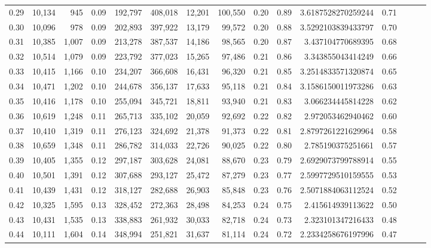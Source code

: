 \begin{tabular}{rrrrrrrrrrrrrrr}
0.29 &  10,134 &    945 &  0.09 &  192,797 &  408,018 &   12,201 &  100,550 &  0.20 &  0.89 &    3.6187528270259244 &      0.71 \\
0.30 &  10,096 &    978 &  0.09 &  202,893 &  397,922 &   13,179 &   99,572 &  0.20 &  0.88 &    3.5292103839433797 &      0.70 \\
0.31 &  10,385 &  1,007 &  0.09 &  213,278 &  387,537 &   14,186 &   98,565 &  0.20 &  0.87 &     3.437104770689395 &      0.68 \\
0.32 &  10,514 &  1,079 &  0.09 &  223,792 &  377,023 &   15,265 &   97,486 &  0.21 &  0.86 &     3.343855043414249 &      0.66 \\
0.33 &  10,415 &  1,166 &  0.10 &  234,207 &  366,608 &   16,431 &   96,320 &  0.21 &  0.85 &    3.2514833571320874 &      0.65 \\
0.34 &  10,471 &  1,202 &  0.10 &  244,678 &  356,137 &   17,633 &   95,118 &  0.21 &  0.84 &    3.1586150011973286 &      0.63 \\
0.35 &  10,416 &  1,178 &  0.10 &  255,094 &  345,721 &   18,811 &   93,940 &  0.21 &  0.83 &     3.066234445814228 &      0.62 \\
0.36 &  10,619 &  1,248 &  0.11 &  265,713 &  335,102 &   20,059 &   92,692 &  0.22 &  0.82 &     2.972053462940462 &      0.60 \\
0.37 &  10,410 &  1,319 &  0.11 &  276,123 &  324,692 &   21,378 &   91,373 &  0.22 &  0.81 &    2.8797261221629964 &      0.58 \\
0.38 &  10,659 &  1,348 &  0.11 &  286,782 &  314,033 &   22,726 &   90,025 &  0.22 &  0.80 &     2.785190375251661 &      0.57 \\
0.39 &  10,405 &  1,355 &  0.12 &  297,187 &  303,628 &   24,081 &   88,670 &  0.23 &  0.79 &    2.6929073799788914 &      0.55 \\
0.40 &  10,501 &  1,391 &  0.12 &  307,688 &  293,127 &   25,472 &   87,279 &  0.23 &  0.77 &    2.5997729510159555 &      0.53 \\
0.41 &  10,439 &  1,431 &  0.12 &  318,127 &  282,688 &   26,903 &   85,848 &  0.23 &  0.76 &    2.5071884063112524 &      0.52 \\
0.42 &  10,325 &  1,595 &  0.13 &  328,452 &  272,363 &   28,498 &   84,253 &  0.24 &  0.75 &     2.415614939113622 &      0.50 \\
0.43 &  10,431 &  1,535 &  0.13 &  338,883 &  261,932 &   30,033 &   82,718 &  0.24 &  0.73 &     2.323101347216433 &      0.48 \\
0.44 &  10,111 &  1,604 &  0.14 &  348,994 &  251,821 &   31,637 &   81,114 &  0.24 &  0.72 &    2.2334258676197996 &      0.47 \\

\end{tabular}
